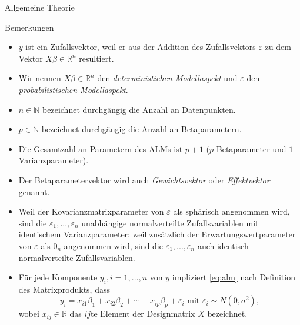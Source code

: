 \documentclass[
  8pt,
  ignorenonframetext,
]{beamer}
\providecommand{\tightlist}{%
  \setlength{\itemsep}{0pt}\setlength{\parskip}{0pt}}
\begin{document}
\begin{frame}{Allgemeine Theorie}
\protect\hypertarget{allgemeine-theorie-1}{}
\footnotesize

Bemerkungen 

\begin{itemize}
\tightlist
\item
  \justifying \(y\) ist ein Zufallsvektor, weil er aus der Addition des
  Zufallsvektors \(\varepsilon\) zu dem Vektor
  \(X\beta \in \mathbb{R}^n\) resultiert.
\item
  Wir nennen \(X\beta \in \mathbb{R}^n\) den
  \textit{deterministichen Modellaspekt} und \(\varepsilon\) den
  \textit{probabilistischen Modellaspekt}.
\item
  \(n \in \mathbb{N}\) bezeichnet durchgängig die Anzahl an
  Datenpunkten.
\item
  \(p \in \mathbb{N}\) bezeichnet durchgängig die Anzahl an
  Betaparametern.
\item
  Die Gesamtzahl an Parametern des ALMs ist \(p + 1\) (\(p\)
  Betaparameter und \(1\) Varianzparameter).
\item
  Der Betaparametervektor wird auch \textit{Gewichtsvektor} oder
  \textit{Effektvektor} genannt.
\item
  Weil der Kovarianzmatrixparameter von \(\varepsilon\) als sphärisch
  angenommen wird, sind die \(\varepsilon_1,...,\varepsilon_n\)
  unabhängige normalverteilte Zufallsvariablen mit identischem
  Varianzparameter; weil zusätzlich der Erwartungswertparameter von
  \(\varepsilon\) als \(0_n\) angenommen wird, sind die
  \(\varepsilon_1,...,\varepsilon_n\) auch identisch normalverteilte
  Zufallsvariablen.
\item
  Für jede Komponente \(y_i, i = 1,...,n\) von \(y\) impliziert
  \eqref{eq:alm} nach Definition des Matrixprodukts, dass
  \begin{equation}
  y_i = x_{i1}\beta_1 + x_{i2}\beta_2 + \cdots +  x_{ip}\beta_p + \varepsilon_i \mbox{ mit } \varepsilon_i \sim N(0,\sigma^2),
  \end{equation} wobei \(x_{ij} \in \mathbb{R}\) das \(ij\)te Element
  der Designmatrix \(X\) bezeichnet.
\end{itemize}
\end{frame}
\end{document}

